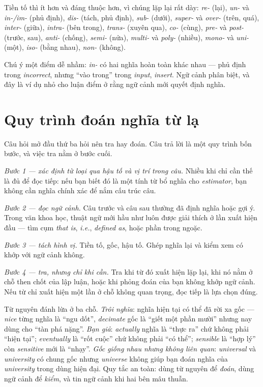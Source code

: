 \documentclass[../../english.tex]{subfiles}
\begin{document}
Tiền tố thì ít hơn và đáng thuộc hơn, vì chúng lặp lại rất dày: \emph{re-} (lại), \emph{un-} và \emph{in-/im-} (phủ định), \emph{dis-} (tách, phủ định), \emph{sub-} (dưới), \emph{super-} và \emph{over-} (trên, quá), \emph{inter-} (giữa), \emph{intra-} (bên trong), \emph{trans-} (xuyên qua), \emph{co-} (cùng), \emph{pre-} và \emph{post-} (trước, sau), \emph{anti-} (chống), \emph{semi-} (nửa), \emph{multi-} và \emph{poly-} (nhiều), \emph{mono-} và \emph{uni-} (một), \emph{iso-} (bằng nhau), \emph{non-} (không).

Chú ý một điểm dễ nhầm: \emph{in-} có hai nghĩa hoàn toàn khác nhau --- phủ định trong \emph{incorrect}, nhưng ``vào trong'' trong \emph{input}, \emph{insert}. Ngữ cảnh phân biệt, và đây là ví dụ nhỏ cho luận điểm ở  rằng ngữ cảnh mới quyết định nghĩa.

\section{Quy trình đoán nghĩa từ lạ}

Câu hỏi mở đầu thứ ba hỏi nên tra hay đoán. Câu trả lời là một quy trình bốn bước, và việc tra nằm ở bước cuối.

\emph{Bước 1 --- xác định từ loại qua hậu tố và vị trí trong câu.} Nhiều khi chỉ cần thế là đủ để đọc tiếp: nếu bạn biết đó là một tính từ bổ nghĩa cho \emph{estimator}, bạn không cần nghĩa chính xác để nắm cấu trúc câu.

\emph{Bước 2 --- đọc ngữ cảnh.} Câu trước và câu sau thường đã định nghĩa hoặc gợi ý. Trong văn khoa học, thuật ngữ mới hầu như luôn được giải thích ở lần xuất hiện đầu --- tìm cụm \emph{that is}, \emph{i.e.}, \emph{defined as}, hoặc phần trong ngoặc.

\emph{Bước 3 --- tách hình vị.} Tiền tố, gốc, hậu tố. Ghép nghĩa lại và kiểm xem có khớp với ngữ cảnh không.

\emph{Bước 4 --- tra, nhưng chỉ khi cần.} Tra khi từ đó xuất hiện lặp lại, khi nó nằm ở chỗ then chốt của lập luận, hoặc khi phỏng đoán của bạn không khớp ngữ cảnh. Nếu từ chỉ xuất hiện một lần ở chỗ không quan trọng, đọc tiếp là lựa chọn đúng.

\begin{cambay}
Từ nguyên đánh lừa ở ba chỗ. \emph{Trôi nghĩa}: nghĩa hiện tại có thể đã rời xa gốc --- \emph{nice} từng nghĩa là ``ngu dốt'', \emph{decimate} gốc là ``giết một phần mười'' nhưng nay dùng cho ``tàn phá nặng''. \emph{Bạn giả}: \emph{actually} nghĩa là ``thực ra'' chứ không phải ``hiện tại''; \emph{eventually} là ``rốt cuộc'' chứ không phải ``có thể''; \emph{sensible} là ``hợp lý'' còn \emph{sensitive} mới là ``nhạy''. \emph{Gốc giống nhau nhưng không liên quan}: \emph{universal} và \emph{university} có chung gốc nhưng \emph{universe} không giúp bạn đoán nghĩa của \emph{university} trong dùng hiện đại. Quy tắc an toàn: dùng từ nguyên để \emph{đoán}, dùng ngữ cảnh để \emph{kiểm}, và tin ngữ cảnh khi hai bên mâu thuẫn.
\end{cambay}
\end{document}
